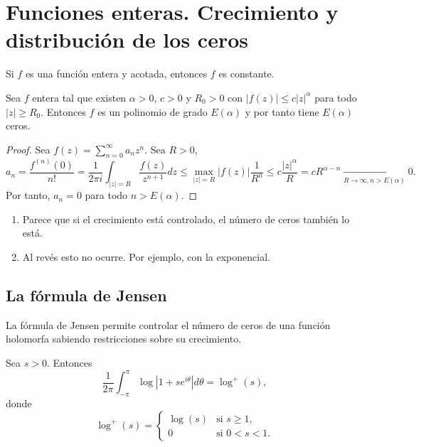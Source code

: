 \chapter{Funciones enteras. Crecimiento y distribución de los ceros}
\begin{theorem}
    Si $f$ es una función entera y acotada, entonces $f$ es constante.
\end{theorem}

\begin{theorem}
    Sea $f$ entera tal que existen $\alpha > 0$, $c > 0$ y $R_0 > 0$ con $|f(z)| \leq c|z|^\alpha$ para todo $|z| \geq R_0$.
    Entonces $f$ es un polinomio de grado $E(\alpha)$ y por tanto tiene $E(\alpha)$ ceros.
\end{theorem}

\begin{proof}
    Sea $f(z) = \sum_{n=0}^\infty a_nz^n$.
    Sea $R > 0$,
    $$a_n = \frac{f^{(n)}(0)}{n!} = \frac{1}{2\pi i} \int_{|z|=R} \frac{f(z)}{z^{n+1}}dz \leq \max_{|z|=R} |f(z)|\frac{1}{R^n} \leq c\frac{|z|^\alpha}{R} = cR^{\alpha-n} \xrightarrow[R \to \infty, n > E(\alpha)]{} 0.$$
    Por tanto, $a_n = 0$ para todo $n > E(\alpha)$.
\end{proof}

\begin{remark}
    \hfill
    \begin{enumerate}
        \item Parece que si el crecimiento está controlado, el número de ceros también lo está.
        \item Al revés esto no ocurre.
              Por ejemplo, con la exponencial.
    \end{enumerate}
\end{remark}

\section{La fórmula de Jensen}
La fórmula de Jensen permite controlar el número de ceros de una función holomorfa sabiendo restricciones sobre su crecimiento.

\begin{lemma}
    Sea $s > 0$.
    Entonces
    $$\frac{1}{2\pi} \int_{-\pi}^\pi \log|1+se^{i\theta}|d\theta = \log^+(s),$$
    donde
    $$\log^+(s) = \begin{cases}
            \log(s) & \text{si } s \geq 1,  \\
            0       & \text{si } 0 < s < 1.
        \end{cases}$$
\end{lemma}


